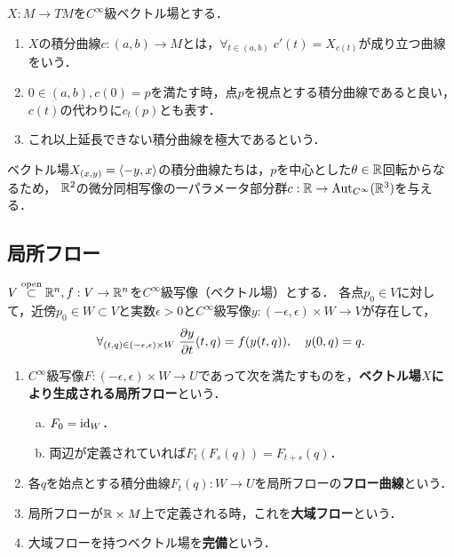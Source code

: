 \documentclass[uplatex,dvipdfmx]{jsreport}
\begin{document}
\begin{definition}
    $X:M\to TM$を$C^\infty$級ベクトル場とする．
    \begin{enumerate}
        \item $X$の積分曲線$c:(a,b)\to M$とは，$\forall_{t\in(a,b)}\;c'(t)=X_{c(t)}$が成り立つ曲線をいう．
        \item $0\in (a,b),c(0)=p$を満たす時，点$p$を視点とする積分曲線であると良い，$c(t)$の代わりに$c_t(p)$とも表す．
        \item これ以上延長できない積分曲線を極大であるという．
    \end{enumerate}
\end{definition}

\begin{example}
    ベクトル場$X_{(x,y)}=\langle-y,x\rangle$の積分曲線たちは，$p$を中心とした$\theta\in\mathbb{R}$回転からなるため，
    $\mathbb{R}^2$の微分同相写像の一パラメータ部分群$c:\mathbb{R}\to\mathrm{Aut}_{C^\infty}(\mathbb{R}^3)$を与える．
\end{example}

\subsection{局所フロー}

\begin{proposition}[時刻に依存する方程式の解]
    $V\overset{\mathrm{open}}{\subset}\mathbb{R}^n,f:V\to\mathbb{R}^n$を$C^\infty$級写像（ベクトル場）とする．
    各点$p_0\in V$に対して，近傍$p_0\in W\subset V$と実数$\epsilon>0$と$C^\infty$級写像$y:(-\epsilon,\epsilon)\times W\to V$が存在して，
    \[\forall_{(t,q)\in(-\epsilon,\epsilon)\times W}\;\frac{\partial y}{\partial t}(t,q)=f(y(t,q)),\quad y(0,q)=q.\]
\end{proposition}

\begin{definition}\mbox{}
    \begin{enumerate}
        \item $C^\infty$級写像$F:(-\epsilon,\epsilon)\times W\to U$であって次を満たすものを，\textbf{ベクトル場$X$により生成される局所フロー}という．\begin{enumerate}[(a)]
            \item $F_0=\mathrm{id}_W$．
            \item 両辺が定義されていれば$F_t(F_s(q))=F_{t+s}(q)$．
        \end{enumerate}
        \item 各$q$を始点とする積分曲線$F_t(q):W\to U$を局所フローの\textbf{フロー曲線}という．
        \item 局所フローが$\mathbb{R}\times M$上で定義される時，これを\textbf{大域フロー}という．
        \item 大域フローを持つベクトル場を\textbf{完備}という．
    \end{enumerate}

\end{definition}
\end{document}
